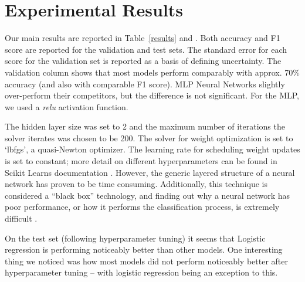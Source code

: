 \section{Experimental Results} \label{experresults}
Our main results are reported in Table~\ref{results} and .
Both accuracy and F1 score are reported for the validation and test sets. The standard error for each score for the validation set is reported as a basis of defining uncertainty. The validation column shows that most models perform comparably with approx. 70\% accuracy (and also with comparable F1 score). MLP Neural Networks slightly over-perform their competitors, but the difference is not significant.
For the MLP, we used a  \textit{relu} activation function.

The hidden layer size was set to 2 and the maximum number of iterations the solver iterates was chosen to be 200. The solver for weight optimization is set to `lbfgs', a quasi-Newton optimizer. The learning rate for scheduling weight updates is set to constant; more detail on different hyperparameters can be found in Scikit Learns documentation \cite{pedregosa2011scikit}. However, the generic layered structure of a neural network has proven to be time consuming. Additionally, this technique is considered a ``black box'' technology, and finding out why a neural network has poor performance, or how it performs the classification process, is extremely difficult \cite{noriega2005multilayer}.

On the test set (following hyperparameter tuning) it seems that Logistic regression is performing noticeably better than other models. One interesting thing we noticed was how most models did not perform noticeably better after hyperparameter tuning -- with logistic regression being an exception to this.


